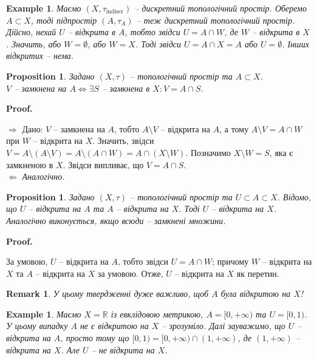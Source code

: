 \documentclass[a4paper, 10pt]{article}
\makeatletter
\def\rightproof{$\boxed{\Rightarrow}$ }
\def\leftproof{$\boxed{\Leftarrow}$ }
\theoremstyle{theoremdd}
\newtheorem{example}[theorem]{Example}
\newtheorem{proposition}[theorem]{Proposition}
\newtheorem{remark}[theorem]{Remark}
\renewenvironment{proof}[1][Proof.\\]{\par
\pushQED{\hfill \qed}%
\normalfont \topsep6\p@\@plus6\p@\relax
\trivlist
\item\relax
{\bfseries
#1\@addpunct{.}}\hspace\labelsep\ignorespaces
}{%
\popQED\endtrivlist\@endpefalse
}
\makeatother
\begin{document}
\begin{example}
\label{subspace_of_indiscrete_space_is_also_indiscrete}
Маємо $(X,\tau_{\text{indiscr}})$ -- дискретний топологічний простір. Оберемо $A \subset X$, тоді підпростір $(A,\tau_{A})$ -- теж дискретний топологічний простір.\\
Дійсно, нехай $U$ -- відкрита в $A$, тобто звідси $U = A \cap W$, де $W$ -- відкрита в $X$. Значить, або $W = \emptyset$, або $W = X$. Тоді звідси $U = A \cap X = A$ або $U = \emptyset$. Інших відкритих -- нема.
\end{example}

\begin{proposition}
Задано $(X,\tau)$ -- топологічний простір та $A \subset X$.\\
$V$ -- замкнена на $A \iff \exists S$ -- замкнена в $X: V = A \cap S$.
\end{proposition}

\begin{proof}
\rightproof Дано: $V$ -- замкнена на $A$, тобто $A \setminus V$ -- відкрита на $A$, а тому $A \setminus V = A \cap W$ при $W$ -- відкрита на $X$. Значить, звідси $V = A \setminus (A \setminus V) = A \setminus (A \cap W) = A \cap (X \setminus W)$. Позначимо $X \setminus W = S$, яка є замкненою в $X$. Звідси випливає, що $V = A \cap S$.
\bigskip \\
\leftproof \textit{Аналогічно.}
\end{proof}

\begin{proposition}
Задано $(X,\tau)$ -- топологічний простір та $U \subset A \subset X$. Відомо, що $U$ -- відкрита на $A$ та $A$ -- відкрита на $X$. Тоді $U$ -- відкрита на $X$.\\
\textit{Аналогічно виконується, якщо всюди -- замкнені множини.}
\end{proposition}

\begin{proof}
За умовою, $U$ -- відкрита на $A$, тобто звідси $U = A \cap W$; причому $W$ -- відкрита на $X$ та $A$ -- відкрита на $X$ за умовою. Отже, $U$ -- відкрита на $X$ як перетин.
\end{proof}

\begin{remark}
У цьому твердженні дуже важливо, щоб $A$ була відкритою на $X$!
\end{remark}

\begin{example}
Маємо $X = \mathbb{R}$ із евклідовою метрикою, $A = [0,+\infty)$ та $U = [0,1)$.\\
У цьому випадку $A$ не є відкритою на $X$ -- зрозуміло. Далі зауважимо, що $U$ -- відкрита на $A$, просто тому що $[0,1) = [0,+\infty) \cap (1,+\infty)$, де $(1,+\infty)$ -- відкрита на $X$. Але $U$ -- не відкрита на $X$.
\end{example}
\end{document}
